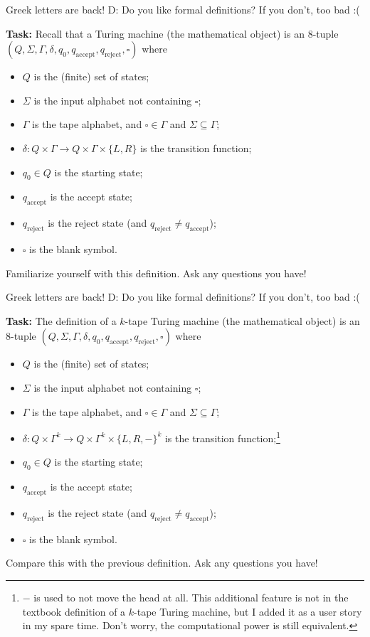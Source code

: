 \documentclass{beamer}
\begin{document}
\begin{frame}{Greek letters are back! D:}
Do you like formal definitions? If you don't, too bad :(

\textbf{Task:} Recall that a Turing machine (the mathematical object) is an $8$-tuple $(Q, \Sigma, \Gamma, \delta, q_0, q_\text{accept}, q_\text{reject}, \square)$ where
\begin{itemize}
\item $Q$ is the (finite) set of states;
\item $\Sigma$ is the input alphabet not containing $\square$;
\item $\Gamma$ is the tape alphabet, and $\square \in \Gamma$ and $\Sigma \subseteq \Gamma$;
\item $\delta: Q \times \Gamma \to Q \times \Gamma \times \{L, R\}$ is the transition function;
\item $q_0 \in Q$ is the starting state;
\item $q_\text{accept}$ is the accept state;
\item $q_\text{reject}$ is the reject state (and $q_\text{reject} \neq q_\text{accept}$);
\item $\square$ is the blank symbol.
\end{itemize}
Familiarize yourself with this definition. Ask any questions you have!
\end{frame}

\begin{frame}{Greek letters are back! D:}
Do you like formal definitions? If you don't, too bad :(

\textbf{Task:} The definition of a $k$-tape Turing machine (the mathematical object) is an $8$-tuple $(Q, \Sigma, \Gamma, \delta, q_0, q_\text{accept}, q_\text{reject}, \square)$ where
\begin{itemize}
\item $Q$ is the (finite) set of states;
\item $\Sigma$ is the input alphabet not containing $\square$;
\item $\Gamma$ is the tape alphabet, and $\square \in \Gamma$ and $\Sigma \subseteq \Gamma$;
\item $\delta: Q \times \Gamma^k \to Q \times \Gamma^k \times \{L, R, -\}^k$ is the transition function;\footnote{$-$ is used to not move the head at all. This additional feature is not in the textbook definition of a $k$-tape Turing machine, but I added it as a user story in my spare time. Don't worry, the computational power is still equivalent.}
\item $q_0 \in Q$ is the starting state;
\item $q_\text{accept}$ is the accept state;
\item $q_\text{reject}$ is the reject state (and $q_\text{reject} \neq q_\text{accept}$);
\item $\square$ is the blank symbol.
\end{itemize}
Compare this with the previous definition. Ask any questions you have!
\end{frame}
\end{document}
